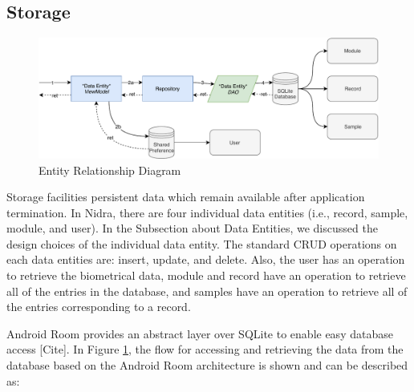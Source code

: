 \subsection{Storage}
\begin{figure}
    \centering
    \includegraphics[scale=0.60]{images/Storage_Imp.pdf}
    \caption{Entity Relationship Diagram}
    \label{fig:impl_storage}
\end{figure}


Storage facilities persistent data which remain available after application termination. In Nidra, there are four individual data entities (i.e., record, sample, module, and user). In the Subsection about Data Entities, we discussed the design choices of the individual data entity. The standard CRUD operations on each data entities are: insert, update, and delete. Also, the user has an operation to retrieve the biometrical data, module and record have an operation to retrieve all of the entries in the database, and samples have an operation to retrieve all of the entries corresponding to a record. 

Android Room provides an abstract layer over SQLite to enable easy database access [Cite]. In Figure \ref{fig:impl_storage}, the flow for accessing and retrieving the data from the database based on the Android Room architecture is shown and can be described as:

